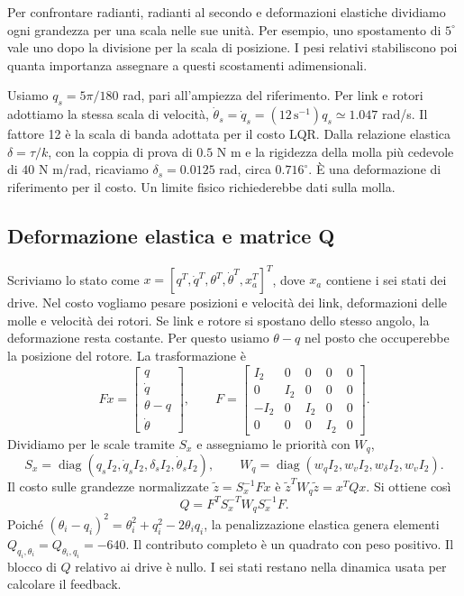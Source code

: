Per confrontare radianti, radianti al secondo e deformazioni elastiche
dividiamo ogni grandezza per una scala nelle sue unità. Per esempio,
uno spostamento di $5^\circ$ vale uno dopo la divisione per la scala di
posizione. I pesi relativi stabiliscono poi quanta importanza assegnare
a questi scostamenti adimensionali.

Usiamo $q_s=5\pi/180$ rad, pari all'ampiezza del riferimento.
Per link e rotori adottiamo la stessa scala di velocità,
$\dot\theta_s=\dot q_s=(12\,\mathrm{s}^{-1})q_s\simeq 1.047$ rad/s.
Il fattore 12 è la scala di banda adottata per il costo LQR.
Dalla relazione elastica $\delta=\tau/k$, con la coppia di prova di
$0.5$ N m e la rigidezza della molla più cedevole di $40$ N m/rad,
ricaviamo $\delta_s=0.0125$ rad, circa $0.716^\circ$.
È una deformazione di riferimento per il costo. Un limite fisico
richiederebbe dati sulla molla.

\subsection{Deformazione elastica e matrice Q}

Scriviamo lo stato come
$x=[q^T,\dot q^T,\theta^T,\dot\theta^T,x_a^T]^T$,
dove $x_a$ contiene i sei stati dei drive. Nel costo vogliamo pesare
posizioni e velocità dei link, deformazioni delle molle e velocità dei
rotori. Se link e rotore si spostano dello stesso angolo, la deformazione
resta costante. Per questo usiamo $\theta-q$ nel posto che occuperebbe
la posizione del rotore. La trasformazione è
\[
Fx=\begin{bmatrix}q\\\dot q\\\theta-q\\\dot\theta\end{bmatrix},
\qquad
F=\begin{bmatrix}
I_2&0&0&0&0\\0&I_2&0&0&0\\-I_2&0&I_2&0&0\\0&0&0&I_2&0
\end{bmatrix}.
\]
Dividiamo per le scale tramite $S_x$ e assegniamo le priorità con $W_q$,
\[
S_x=\operatorname{diag}(q_sI_2,\dot q_sI_2,\delta_sI_2,\dot\theta_sI_2),
\qquad
W_q=\operatorname{diag}(w_qI_2,w_vI_2,w_\delta I_2,w_vI_2).
\]
Il costo sulle grandezze normalizzate $\tilde z=S_x^{-1}Fx$ è
$\tilde z^TW_q\tilde z=x^TQx$. Si ottiene così
\[
Q=F^TS_x^{-T}W_qS_x^{-1}F.
\]
Poiché $(\theta_i-q_i)^2=\theta_i^2+q_i^2-2\theta_iq_i$,
la penalizzazione elastica genera elementi $Q_{q_i,\theta_i}
=Q_{\theta_i,q_i}=-640$. Il contributo completo è un quadrato
con peso positivo.
Il blocco di $Q$ relativo ai drive è nullo. I sei stati restano nella
dinamica usata per calcolare il feedback.


